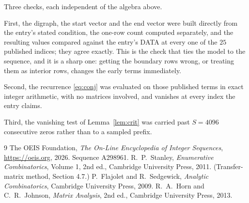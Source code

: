\documentclass[11pt,a4paper]{article}
\theoremstyle{plain}
\theoremstyle{definition}
\begin{document}
Three checks, each independent of the algebra above.

First, the digraph, the start vector and the end vector were built directly from the
entry's stated condition, the one-row count computed separately, and the resulting values
compared against the entry's DATA at every one of the $25$ published indices; they
agree exactly. This is the check that ties the model to the sequence, and it is a sharp one:
getting the boundary rows wrong, or treating them as interior rows, changes the early terms
immediately.

Second, the recurrence \eqref{eq:conj} was evaluated on those published terms in exact
integer arithmetic, with no matrices involved, and vanishes at every index the entry claims.

Third, the vanishing test of Lemma~\ref{lem:crit} was carried past $S=4096$ consecutive
zeros rather than to a sampled prefix.

\begin{thebibliography}{9}
 The OEIS Foundation, \emph{The On-Line Encyclopedia of Integer
Sequences}, \url{https://oeis.org}, 2026. Sequence A298961.
 R.~P.~Stanley, \emph{Enumerative Combinatorics}, Volume 1, 2nd ed.,
Cambridge University Press, 2011. (Transfer-matrix method, Section 4.7.)
 P.~Flajolet and R.~Sedgewick, \emph{Analytic Combinatorics}, Cambridge
University Press, 2009.
 R.~A.~Horn and C.~R.~Johnson, \emph{Matrix Analysis}, 2nd ed., Cambridge
University Press, 2013.
\end{thebibliography}
\end{document}
